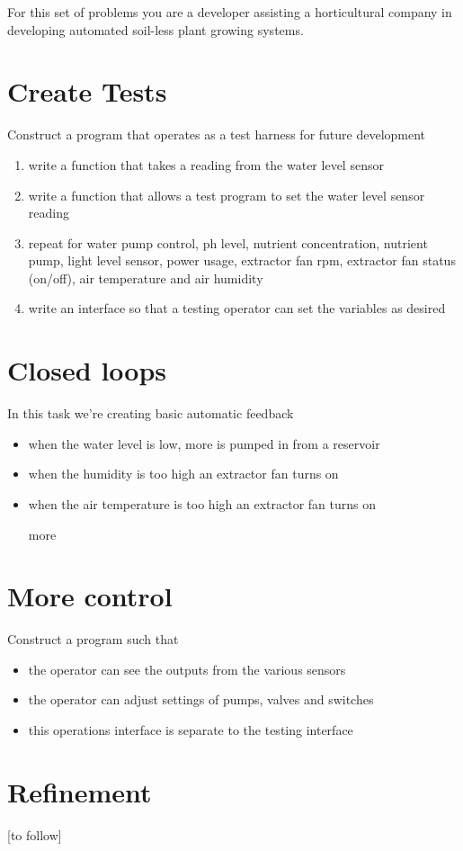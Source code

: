 \documentclass[11pt]{book}
\begin{document}
For this set of problems you are a developer assisting a horticultural company in developing automated soil-less plant growing systems.

\clearpage

\section{Create Tests}

Construct a program that operates as a test harness for future development

\begin{enumerate}
\item write a function that takes a reading from the water level sensor
\item write a function that allows a test program to set the water level sensor reading
\item repeat for water pump control, ph level, nutrient concentration, nutrient pump, light level sensor, power usage, extractor fan rpm, extractor fan status (on/off), air temperature and air humidity
\item write an interface so that a testing operator can set the variables as desired
\end{enumerate}

\clearpage

\section{Closed loops}

In this task we're creating basic automatic feedback

\begin{itemize}
\item when the water level is low, more is pumped in from a reservoir
\item when the humidity is too high an extractor fan turns on
\item when the air temperature is too high an extractor fan turns on
\item [more]
\end{itemize}

\clearpage

\section{More control}

Construct a program such that

\begin{itemize}
\item the operator can see the outputs from the various sensors
\item the operator can adjust settings of pumps, valves and switches
\item this operations interface is separate to the testing interface
\end{itemize}

\clearpage

\section{Refinement}


[to follow]
\end{document}
